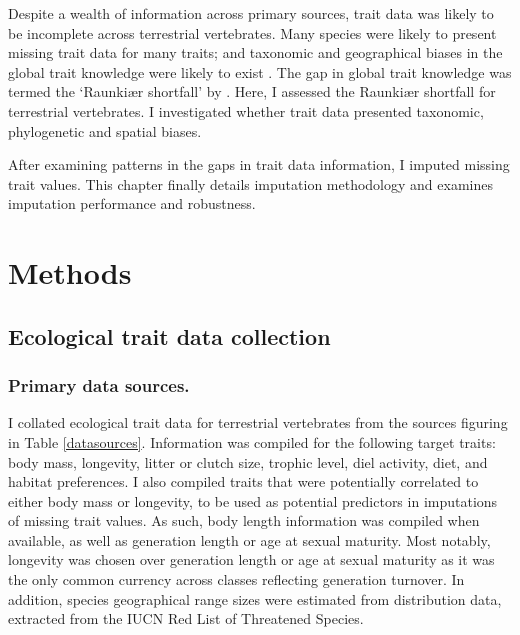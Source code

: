 Despite a wealth of information across primary sources, trait data was likely to be incomplete across terrestrial vertebrates. Many species were likely to present missing trait data for many traits; and taxonomic and geographical biases in the global trait knowledge were likely to exist \citep{Hortal2014}. The gap in global trait knowledge was termed the `Raunki{\ae}r shortfall' by \citet{Hortal2014}. Here, I assessed the Raunki{\ae}r shortfall for terrestrial vertebrates. I investigated whether trait data presented taxonomic, phylogenetic and spatial biases.  

After examining patterns in the gaps in trait data information, I imputed missing trait values. This chapter finally details imputation methodology and examines imputation performance and robustness.



\section{Methods}

\subsection{Ecological trait data collection}

\subsubsection{Primary data sources.}
I collated ecological trait data for terrestrial vertebrates from the sources figuring in Table \ref{datasources}. Information was compiled for the following target traits: body mass, longevity, litter or clutch size, trophic level, diel activity, diet, and habitat preferences. I also compiled traits that were potentially correlated to either body mass or longevity, to be used as potential predictors in imputations of missing trait values. As such, body length information was compiled when available, as well as generation length or age at sexual maturity. Most notably, longevity was chosen over generation length or age at sexual maturity as it was the only common currency across classes reflecting generation turnover. In addition, species geographical range sizes were estimated from distribution data, extracted from the IUCN Red List of Threatened Species.

